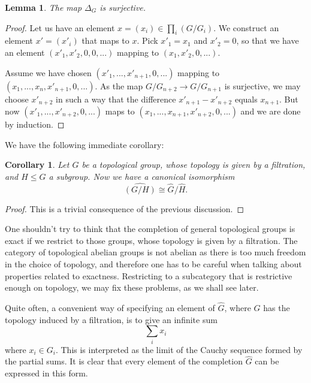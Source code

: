 \documentclass[12pt,a4paper,leqno]{article}
\theoremstyle{plain}
\newtheorem{lem}[theo]{Lemma}
\newtheorem{cor}[theo]{Corollary}
\theoremstyle{definition}
\theoremstyle{remark}
\begin{document}
\begin{lem}
The map $\Delta_G$ is surjective. 
\end{lem}
\begin{proof}
Let us have an element $x = (x_i) \in \prod_i (G / G_i)$. We construct an element $x' = (x'_i)$ that maps to $x$. Pick $x'_1 = x_1$  and $x'_2 = 0$, so that we have an element $(x'_1, x'_2, 0, 0, ...)$ mapping to $(x_1, x'_2, 0, ...)$.

Assume we have chosen $(x'_1, ..., x'_{n+1}, 0 , ...)$ mapping to $(x_1,...,x_n,x'_{n+1},0,...)$. As the map $G / G_{n+2} \to G / G_{n+1}$ is surjective, we may choose $x'_{n+2}$ in such a way that the difference $x'_{n+1} - x'_{n+2}$ equals $x_{n+1}$. But now $(x'_1, ..., x'_{n+2},0 , ...)$ maps to $(x_1,...,x_{n+1}, x'_{n+2},0,...)$ and we are done by induction.
\end{proof}

We have the following immediate corollary:

\begin{cor}
Let $G$ be a topological group, whose topology is given by a filtration, and $H \leq G$ a subgroup. Now we have a canonical isomorphism 
\begin{equation*}
\widehat{(G/H)} \cong \widehat{G} / \widehat{H}.
\end{equation*}
\end{cor}
\begin{proof}
This is a trivial consequence of the previous discussion.
\end{proof}

One shouldn't try to think that the completion of general topological groups is exact if we restrict to those groups, whose topology is given by a filtration. The category of topological abelian groups is not abelian as there is too much freedom in the choice of topology, and therefore one has to be careful when talking about properties related to exactness. Restricting to a subcategory that is restrictive enough on topology, we may fix these problems, as we shall see later.

Quite often, a convenient way of specifying an element of $\widehat G$, where $G$ has the topology induced by a filtration, is to give an infinite sum
\begin{equation*}
\sum_i x_i
\end{equation*}
where $x_i \in G_i$. This is interpreted as the limit of the Cauchy sequence formed by the partial sums. It is clear that every element of the completion $\widehat G$ can be expressed in this form. 
\end{document}
